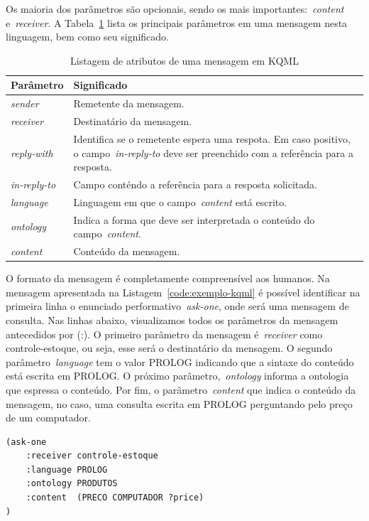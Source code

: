 Os maioria dos parâmetros são opcionais, sendo os mais importantes:~\emph{content} e~\emph{receiver}. A Tabela~\ref{parametros_kqml} lista os principais parâmetros em uma mensagem nesta linguagem, bem como seu significado.

\begin{table}
	\caption{Listagem de atributos de uma mensagem em KQML}
	\begin{tabular}{|p{3cm} | p{12cm} |}
		\hline
		\textbf{Parâmetro}	& \textbf{Significado}	\\
		\hline
		\emph{sender}		& Remetente da mensagem. \\
		\hline
		\emph{receiver}	& Destinatário da mensagem. \\
		\hline
		\emph{reply-with}	& Identifica se o remetente espera uma respota. Em caso positivo, o campo~\emph{in-reply-to} deve ser preenchido com a referência para a resposta. \\
		\hline
		\emph{in-reply-to}	& Campo conténdo a referência para a resposta solicitada. \\
		\hline
		\emph{language}	& Linguagem em que o campo~\emph{content} está escrito. \\ 
		\hline
		\emph{ontology}	& Indica a forma que deve ser interpretada o conteúdo do campo~\emph{content}. \\
		\hline
		\emph{content}		& Conteúdo da mensagem. \\
		\hline
	\end{tabular}
	\label{parametros_kqml}
\end{table}
O formato da mensagem é completamente compreensível aos humanos. Na mensagem apresentada na Listagem~\ref{code:exemplo-kqml} é possível identificar na primeira linha o enunciado performativo~\emph{ask-one}, onde será uma mensagem de consulta. Nas linhas abaixo, visualizamos todos os parâmetros da mensagem antecedidos por (:). O primeiro parâmetro da mensagem é~\emph{receiver} como controle-estoque, ou seja, esse será o destinatário da mensagem. O segundo parâmetro~\emph{language} tem o valor PROLOG indicando que a sintaxe do conteúdo está escrita em PROLOG. O próximo parâmetro,~\emph{ontology} informa a ontologia que espressa o conteúdo. Por fim, o parâmetro~\emph{content} que indica o conteúdo da mensagem, no caso, uma consulta escrita em PROLOG perguntando pelo preço de um computador.

\begin{lstlisting}[label=code:exemplo-kqml,caption=Exemplo de mensagem em KQML]
(ask-one
	:receiver controle-estoque
	:language PROLOG
	:ontology PRODUTOS
	:content  (PRECO COMPUTADOR ?price)
)
\end{lstlisting}

